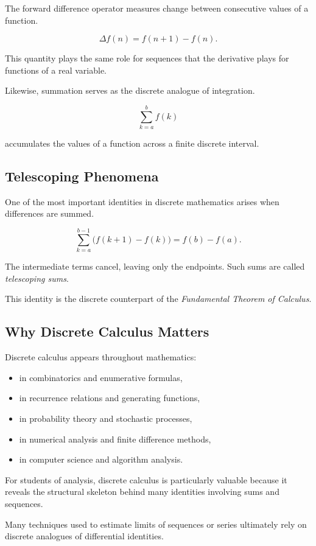 The forward difference operator measures change between consecutive values of a
function.

\[
\Delta f(n) = f(n+1) - f(n).
\]

This quantity plays the same role for sequences that the derivative plays for
functions of a real variable.

Likewise, summation serves as the discrete analogue of integration.

\[
\sum_{k=a}^{b} f(k)
\]

accumulates the values of a function across a finite discrete interval.

\subsection*{Telescoping Phenomena}

One of the most important identities in discrete mathematics arises when
differences are summed.

\[
\sum_{k=a}^{b-1} \bigl(f(k+1)-f(k)\bigr)
=
f(b)-f(a).
\]

The intermediate terms cancel, leaving only the endpoints. Such sums are called
\emph{telescoping sums}.

This identity is the discrete counterpart of the
\emph{Fundamental Theorem of Calculus}.

\subsection*{Why Discrete Calculus Matters}

Discrete calculus appears throughout mathematics:

\begin{itemize}
\item in combinatorics and enumerative formulas,
\item in recurrence relations and generating functions,
\item in probability theory and stochastic processes,
\item in numerical analysis and finite difference methods,
\item in computer science and algorithm analysis.
\end{itemize}

For students of analysis, discrete calculus is particularly valuable because it
reveals the structural skeleton behind many identities involving sums and
sequences.

Many techniques used to estimate limits of sequences or series ultimately rely
on discrete analogues of differential identities.

